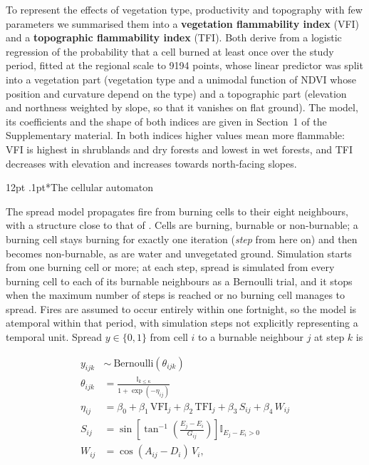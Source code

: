 \documentclass[ResearchPaper,linenum]{CSIRO_LaTeX_Template}
\makeatletter
\renewcommand\subsubsection{\@startsection{subsubsection}{3}{\z@}%
  {12pt \@plus 1pt \@minus 1pt}{.1pt}{\subsubsectionfont}}
\makeatother
\begin{document}
To represent the effects of vegetation type, productivity and topography with few
parameters we summarised them into a \textbf{vegetation flammability index} (VFI) and a
\textbf{topographic flammability index} (TFI). Both derive from a logistic regression
of the probability that a cell burned at least once over the study period, fitted at
the regional scale to 9194 points, whose linear predictor was
split into a vegetation part (vegetation type and a unimodal function of NDVI whose
position and curvature depend on the type) and a topographic part (elevation and
northness weighted by slope, so that it vanishes on flat ground). The model, its
coefficients and the shape of both indices are given in Section~1 of the Supplementary
material. In both indices higher values mean more flammable: 
VFI is highest in shrublands and dry
forests and lowest in wet forests, and TFI decreases with elevation and increases
towards north-facing slopes.

\subsubsection*{The cellular automaton}

The spread model propagates fire from burning cells to their eight neighbours, with a
structure close to that of \citet{morales_stochastic_2015}. Cells are burning, burnable
or non-burnable; a burning cell stays burning for exactly one iteration (\textit{step}
from here on) and then becomes non-burnable, as are water and unvegetated ground. 
Simulation starts from one burning cell or more; at each
step, spread is simulated from every burning cell to each of its burnable neighbours 
as a Bernoulli trial, and it stops when the maximum number of steps is reached or no burning
cell manages to spread. Fires are assumed to occur entirely within one fortnight, so
the model is atemporal within that period, with simulation steps not explicitly 
representing a temporal unit. 
Spread $y \in \{0, 1\}$ from cell $i$ to a burnable neighbour $j$ at step $k$ is

\begin{equation}
\label{eq:datamodel}
\begin{aligned}
    y_{ijk} &\sim \ \text{Bernoulli}(\theta_{ijk}) \\
    \theta_{ijk} &= \frac{\mathbb{I}_{k \le \kappa}}{1 + \exp{(-\eta_{ij})}} \\
    \eta_{ij} &= \beta_0 + \beta_1 \, \mathrm{VFI}_j + \beta_2 \, \mathrm{TFI}_j
                 + \beta_3 \, S_{ij} + \beta_4 \, W_{ij} \\
    S_{ij} &= \sin\left[ \tan^{-1} \left( \frac{E_j - E_i}{G_{ij}} \right) \right]
              \mathbb{I}_{E_j - E_i > 0} \\
    W_{ij} &= \cos(A_{ij} - D_i) \, V_i,
\end{aligned}
\end{equation}
\end{document}
